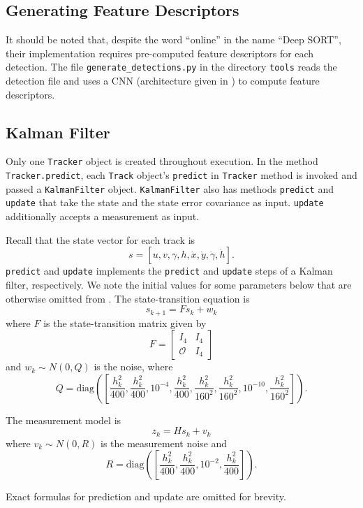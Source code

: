 \documentclass[conference]{IEEEtran}
\begin{document}
\subsection{Generating Feature Descriptors}

It should be noted that, despite the word ``online'' in the name ``Deep SORT'', their implementation requires pre-computed feature descriptors for each detection. The file \texttt{generate\_detections.py} in the directory \texttt{tools} reads the detection file and uses a CNN (architecture given in \cite{Wojke2018deep}) to compute feature descriptors.

\subsection{Kalman Filter}

Only one \texttt{Tracker} object is created throughout execution. In the method \texttt{Tracker.predict}, each \texttt{Track} object's \texttt{predict} in \texttt{Tracker} method is invoked and passed a \texttt{KalmanFilter} object. \texttt{KalmanFilter} also has methods \texttt{predict} and \texttt{update} that take the state and the state error covariance as input. \texttt{update} additionally accepts a measurement as input.

Recall that the state vector for each track is
\[
    s = [u, v, \gamma, h, \dot{x}, \dot{y}, \dot{\gamma}, \dot{h}].
\]
\texttt{predict} and \texttt{update} implements the \texttt{predict} and \texttt{update} steps of a Kalman filter, respectively. We note the initial values for some parameters below that are otherwise omitted from \cite{Wojke2018deep}. The state-transition equation is
\[
    s_{k + 1} = Fs_k + w_k
\]
where $F$ is the state-transition matrix given by
\[
    F = \begin{bmatrix}
        I_4 & I_4\\
        \mathcal{O} & I_4
    \end{bmatrix}
\]
and $w_k \sim N(0, Q)$ is the noise, where
\[
    Q = \mathrm{diag}([\frac{h_k^2}{400}, \frac{h_k^2}{400}, 10^{-4}, \frac{h_k^2}{400}, \frac{h_k^2}{160^2}, \frac{h_k^2}{160^2}, 10^{-10}, \frac{h_k^2}{160^2}]).
\]

The measurement model is
\[
    z_k = Hs_k + v_k
\]
where $v_k \sim N(0, R)$ is the measurement noise and
\[
    R = \mathrm{diag}([\frac{h_k^2}{400}, \frac{h_k^2}{400}, 10^{-2}, \frac{h_k^2}{400}]).
\]

Exact formulas for prediction and update are omitted for brevity.
\end{document}
